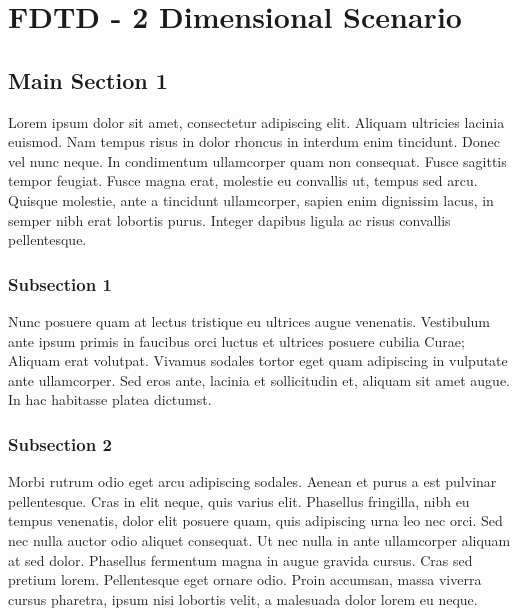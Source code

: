 
\chapter{FDTD - 2 Dimensional Scenario} %

\label{Chapter3} %


\section{Main Section 1}

Lorem ipsum dolor sit amet, consectetur adipiscing elit. Aliquam ultricies lacinia euismod. Nam tempus risus in dolor rhoncus in interdum enim tincidunt. Donec vel nunc neque. In condimentum ullamcorper quam non consequat. Fusce sagittis tempor feugiat. Fusce magna erat, molestie eu convallis ut, tempus sed arcu. Quisque molestie, ante a tincidunt ullamcorper, sapien enim dignissim lacus, in semper nibh erat lobortis purus. Integer dapibus ligula ac risus convallis pellentesque.

\subsection{Subsection 1}

Nunc posuere quam at lectus tristique eu ultrices augue venenatis. Vestibulum ante ipsum primis in faucibus orci luctus et ultrices posuere cubilia Curae; Aliquam erat volutpat. Vivamus sodales tortor eget quam adipiscing in vulputate ante ullamcorper. Sed eros ante, lacinia et sollicitudin et, aliquam sit amet augue. In hac habitasse platea dictumst.


\subsection{Subsection 2}
Morbi rutrum odio eget arcu adipiscing sodales. Aenean et purus a est pulvinar pellentesque. Cras in elit neque, quis varius elit. Phasellus fringilla, nibh eu tempus venenatis, dolor elit posuere quam, quis adipiscing urna leo nec orci. Sed nec nulla auctor odio aliquet consequat. Ut nec nulla in ante ullamcorper aliquam at sed dolor. Phasellus fermentum magna in augue gravida cursus. Cras sed pretium lorem. Pellentesque eget ornare odio. Proin accumsan, massa viverra cursus pharetra, ipsum nisi lobortis velit, a malesuada dolor lorem eu neque.

